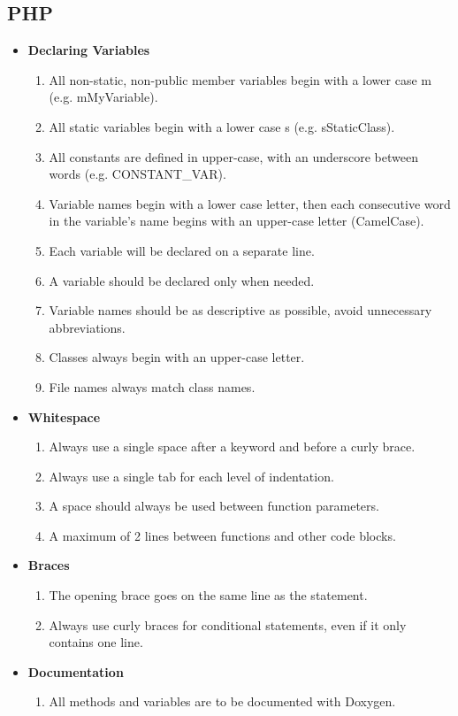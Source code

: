 \documentclass[11pt,a4paper]{article}
\begin{document}
\subsection{PHP}
\begin{itemize}
\item \textbf{Declaring Variables}
	\begin{enumerate}
	\item All non-static, non-public member variables begin with a lower case m (e.g. mMyVariable).
	\item All static variables begin with a lower case s (e.g. sStaticClass).
    \item All constants are defined in upper-case, with an underscore between words (e.g. CONSTANT\_VAR).
	\item Variable names begin with a lower case letter, then each consecutive word in the variable's name begins with an upper-case letter (CamelCase).
	\item Each variable will be declared on a separate line.
	\item A variable should be declared only when needed.
	\item Variable names should be as descriptive as possible, avoid unnecessary abbreviations.
	\item Classes always begin with an upper-case letter.
	\item File names always match class names.
	\end{enumerate}
\item \textbf{Whitespace}
	\begin{enumerate}
	\item Always use a single space after a keyword and before a curly brace.
    \item Always use a single tab for each level of indentation.
    \item A space should always be used between function parameters.
    \item A maximum of 2 lines between functions and other code blocks.
	\end{enumerate}
\item \textbf{Braces}
	\begin{enumerate}
	\item The opening brace goes on the same line as the statement.
	\item Always use curly braces for conditional statements, even if it only contains one line.
	\end{enumerate}
\item \textbf{Documentation}
	\begin{enumerate}
	\item All methods and variables are to be documented with Doxygen.
	\end{enumerate}
\end{itemize}
\end{document}
